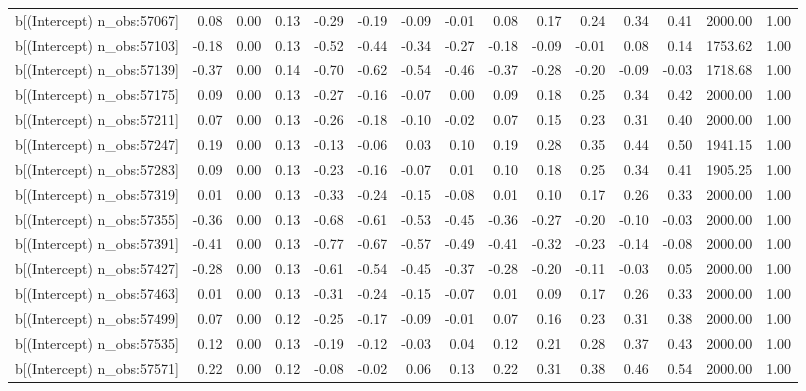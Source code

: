 \begin{table}[ht]
\begin{tabular}{rrrrrrrrrrrrrrr}
  b[(Intercept) n\_obs:57067] & 0.08 & 0.00 & 0.13 & -0.29 & -0.19 & -0.09 & -0.01 & 0.08 & 0.17 & 0.24 & 0.34 & 0.41 & 2000.00 & 1.00 \\ 
  b[(Intercept) n\_obs:57103] & -0.18 & 0.00 & 0.13 & -0.52 & -0.44 & -0.34 & -0.27 & -0.18 & -0.09 & -0.01 & 0.08 & 0.14 & 1753.62 & 1.00 \\ 
  b[(Intercept) n\_obs:57139] & -0.37 & 0.00 & 0.14 & -0.70 & -0.62 & -0.54 & -0.46 & -0.37 & -0.28 & -0.20 & -0.09 & -0.03 & 1718.68 & 1.00 \\ 
  b[(Intercept) n\_obs:57175] & 0.09 & 0.00 & 0.13 & -0.27 & -0.16 & -0.07 & 0.00 & 0.09 & 0.18 & 0.25 & 0.34 & 0.42 & 2000.00 & 1.00 \\ 
  b[(Intercept) n\_obs:57211] & 0.07 & 0.00 & 0.13 & -0.26 & -0.18 & -0.10 & -0.02 & 0.07 & 0.15 & 0.23 & 0.31 & 0.40 & 2000.00 & 1.00 \\ 
  b[(Intercept) n\_obs:57247] & 0.19 & 0.00 & 0.13 & -0.13 & -0.06 & 0.03 & 0.10 & 0.19 & 0.28 & 0.35 & 0.44 & 0.50 & 1941.15 & 1.00 \\ 
  b[(Intercept) n\_obs:57283] & 0.09 & 0.00 & 0.13 & -0.23 & -0.16 & -0.07 & 0.01 & 0.10 & 0.18 & 0.25 & 0.34 & 0.41 & 1905.25 & 1.00 \\ 
  b[(Intercept) n\_obs:57319] & 0.01 & 0.00 & 0.13 & -0.33 & -0.24 & -0.15 & -0.08 & 0.01 & 0.10 & 0.17 & 0.26 & 0.33 & 2000.00 & 1.00 \\ 
  b[(Intercept) n\_obs:57355] & -0.36 & 0.00 & 0.13 & -0.68 & -0.61 & -0.53 & -0.45 & -0.36 & -0.27 & -0.20 & -0.10 & -0.03 & 2000.00 & 1.00 \\ 
  b[(Intercept) n\_obs:57391] & -0.41 & 0.00 & 0.13 & -0.77 & -0.67 & -0.57 & -0.49 & -0.41 & -0.32 & -0.23 & -0.14 & -0.08 & 2000.00 & 1.00 \\ 
  b[(Intercept) n\_obs:57427] & -0.28 & 0.00 & 0.13 & -0.61 & -0.54 & -0.45 & -0.37 & -0.28 & -0.20 & -0.11 & -0.03 & 0.05 & 2000.00 & 1.00 \\ 
  b[(Intercept) n\_obs:57463] & 0.01 & 0.00 & 0.13 & -0.31 & -0.24 & -0.15 & -0.07 & 0.01 & 0.09 & 0.17 & 0.26 & 0.33 & 2000.00 & 1.00 \\ 
  b[(Intercept) n\_obs:57499] & 0.07 & 0.00 & 0.12 & -0.25 & -0.17 & -0.09 & -0.01 & 0.07 & 0.16 & 0.23 & 0.31 & 0.38 & 2000.00 & 1.00 \\ 
  b[(Intercept) n\_obs:57535] & 0.12 & 0.00 & 0.13 & -0.19 & -0.12 & -0.03 & 0.04 & 0.12 & 0.21 & 0.28 & 0.37 & 0.43 & 2000.00 & 1.00 \\ 
  b[(Intercept) n\_obs:57571] & 0.22 & 0.00 & 0.12 & -0.08 & -0.02 & 0.06 & 0.13 & 0.22 & 0.31 & 0.38 & 0.46 & 0.54 & 2000.00 & 1.00 \\ 

\end{tabular}
\end{table}
